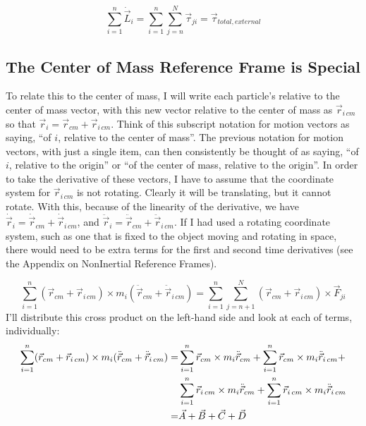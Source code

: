 \documentclass[10pt]{article}
\begin{document}
\begin{equation}
    \sum_{i=1}^n\dot{\vec{L}}_i = 
        \sum_{i=1}^n\sum_{j=n}^N\vec{\tau}_{ji} =
        \vec{\tau}_{total,external} \label{n2mr}
\end{equation}

\subsection{The Center of Mass Reference Frame is Special}

To relate this to the center of mass, I will write each particle's 
relative to the center of mass vector, with this new vector relative to the 
center of mass as $\vec{r}_{i\,cm}$ so that 
$\vec{r}_i = \vec{r}_{cm}+\vec{r}_{i\,cm}$. Think of this subscript 
notation for motion vectors as saying, ``of $i$, 
relative to the center of mass''. The previous notation for motion vectors, 
with just a single item, can then consistently be thought of as saying, 
``of $i$, relative to the origin'' or ``of the center of mass, relative 
to the origin''. 
In order to take the derivative of these vectors, I have to 
assume that the coordinate system for $\vec{r}_{i\,cm}$ is 
not rotating. Clearly it will be translating, but it cannot rotate. 
With this, because of the linearity 
of the derivative, we have 
$\dot{\vec{r}}_i = \dot{\vec{r}}_{cm}+\dot{\vec{r}}_{i\,cm}$, and
$\ddot{\vec{r}}_i = \ddot{\vec{r}}_{cm}+\ddot{\vec{r}}_{i\,cm}$. If I had 
used a rotating coordinate system, such as one that is fixed to the object 
moving and rotating in space, there would need to be extra terms for 
the first and second time derivatives (see the Appendix on NonInertial 
Reference Frames).

\begin{equation*}
    \sum_{i=1}^n(\vec{r}_{cm}+\vec{r}_{i\,cm})\times m_i
        (\ddot{\vec{r}}_{cm}+\ddot{\vec{r}}_{i\,cm}) = 
        \sum_{i=1}^n\sum_{j=n+1}^N(\vec{r}_{cm}+\vec{r}_{i\,cm})\times
        \vec{F}_{ji}
\end{equation*}
I'll distribute this cross product on the left-hand side and look at each of 
terms, individually:
\begin{align}
    \sum_{i=1}^n(\vec{r}_{cm}+\vec{r}_{i\,cm})\times m_i
        (\ddot{\vec{r}}_{cm}+\ddot{\vec{r}}_{i\,cm}) =& 
        \sum_{i=1}^n \vec{r}_{cm}\times m_i\ddot{\vec{r}}_{cm} + 
        \sum_{i=1}^n \vec{r}_{cm}\times m_i\ddot{\vec{r}}_{i\,cm} + \notag\\
        &\sum_{i=1}^n \vec{r}_{i\,cm}\times m_i\ddot{\vec{r}}_{cm} + 
        \sum_{i=1}^n \vec{r}_{i\,cm}\times m_i\ddot{\vec{r}}_{i\,cm} \notag \\
    =& \vec A + \vec B + \vec C + \vec D \label{abcd}
\end{align}
\end{document}

